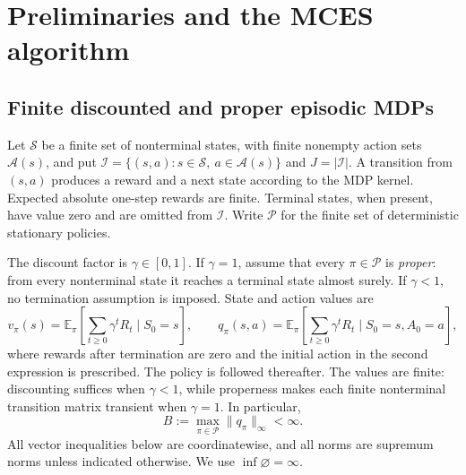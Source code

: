 \section{Preliminaries and the MCES algorithm}\label{sec:preliminaries}
\subsection{Finite discounted and proper episodic MDPs}
Let $\mathcal S$ be a finite set of nonterminal states, with finite nonempty action sets $\mathcal A(s)$, and put
$\mathcal I=\{(s,a):s\in\mathcal S,\ a\in\mathcal A(s)\}$ and $J=|\mathcal I|$. A transition from $(s,a)$ produces a reward and
a next state according to the MDP kernel. Expected absolute one-step rewards are finite.
Terminal states, when present, have value zero and are omitted from $\mathcal I$. Write $\mathcal P$ for the
finite set of deterministic stationary policies.

The discount factor is $\gamma\in[0,1]$. If $\gamma=1$, assume that every $\pi\in\mathcal P$ is \emph{proper}: from
every nonterminal state it reaches a terminal state almost surely. If $\gamma<1$, no termination
assumption is imposed. State and action values are
\[
v_\pi(s)=\mathbb E_\pi\!\left[\sum_{t\ge0}\gamma^tR_t\mid S_0=s\right],\qquad
q_\pi(s,a)=\mathbb E_\pi\!\left[\sum_{t\ge0}\gamma^tR_t\mid S_0=s,A_0=a\right],
\]
where rewards after termination are zero and the initial action in the second expression is
prescribed. The policy is followed thereafter. The values are finite: discounting suffices when
$\gamma<1$, while properness makes each finite nonterminal transition matrix transient when
$\gamma=1$. In particular,
\begin{equation}\label{eq:bound}
B:=\max_{\pi\in\mathcal P}\|q_\pi\|_\infty<\infty.
\end{equation}
All vector inequalities below are coordinatewise, and all norms are supremum norms unless
indicated otherwise. We use $\inf\varnothing=\infty$.


